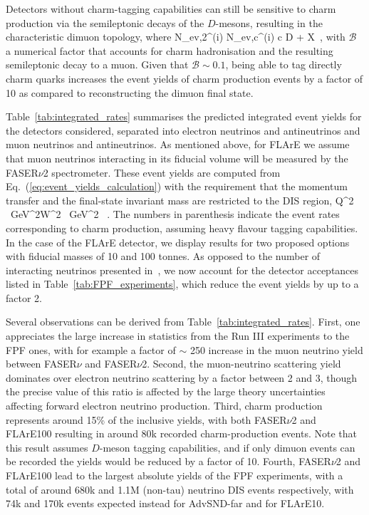   Detectors without charm-tagging capabilities can still be sensitive to charm production via
  the semileptonic decays of the $D$-mesons, resulting in the characteristic
  dimuon topology, where
  \be
 N_{\rm ev,2\mu}^{(i)} \approx N_{\rm ev,c}^{(i)} \times {}\lp c \to D \to \mu + X\rp \, ,
 \ee
 with $\mathcal{B}$ a numerical factor that accounts for charm hadronisation and the
 resulting semileptonic decay to a muon.
 Given that $\mathcal{B}\sim 0.1$, being able to tag directly charm quarks increases the event yields
 of charm production events by a factor of 10 as compared to reconstructing the dimuon final state.

 Table~\ref{tab:integrated_rates} summarises the predicted integrated event yields for the
 detectors
considered, separated into electron neutrinos and antineutrinos
and muon neutrinos and antineutrinos.
%
As mentioned above, for FLArE we assume that muon neutrinos interacting
in its fiducial volume will be measured
by the FASER$\nu$2 spectrometer.
These event yields are computed from Eq.~(\ref{eq:event_yields_calculation}) with the
requirement that the momentum transfer and the final-state invariant mass are restricted
to the DIS region,
\be
\label{eq:DISconditions}
Q^2 ~{\rm GeV}^2\quad  W^2 ~{\rm GeV}^2 \, .
\ee
%
The numbers in parenthesis indicate the event rates corresponding to charm
production, assuming heavy flavour tagging capabilities.
%
In the case of the FLArE detector, we display results for two proposed options with fiducial
masses of 10 and 100 tonnes.
%
As opposed to the number of interacting neutrinos presented
in~\cite{Feng:2022inv}, we now account for the
detector acceptances listed in  Table~\ref{tab:FPF_experiments}, which reduce
the event yields by up to a factor 2.





Several observations can be derived from Table~\ref{tab:integrated_rates}.
%
First, one appreciates the large increase in statistics from
the Run III experiments to the FPF ones, with for example a factor of
$\sim$ 250 increase in the muon neutrino yield between FASER$\nu$ and
FASER$\nu$2.
%
Second, the muon-neutrino scattering yield dominates over electron neutrino scattering by a factor
between 2 and 3, though the precise value of this ratio is affected by the large theory uncertainties
affecting forward electron neutrino production.
%
Third, charm production  represents around 15\% of the inclusive
yields, with both FASER$\nu$2 and FLArE100 resulting in around
80k recorded charm-production events.
%
Note that this result assumes $D$-meson tagging capabilities,
and if only dimuon events can be recorded
the yields would be reduced by a factor of 10.
%
Fourth, FASER$\nu$2 and FLArE100 lead to the largest absolute
yields of the FPF experiments, with a total of around 680k and 1.1M (non-tau) neutrino DIS events respectively, with 74k and 170k
events expected instead for AdvSND-far and for FLArE10.

